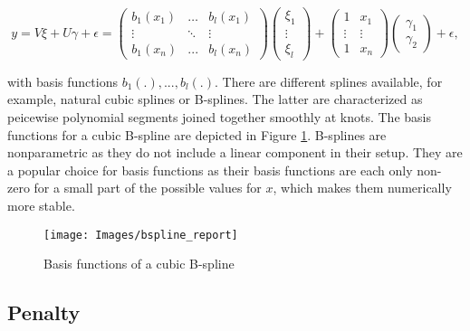 \documentclass[12pt]{article}
\begin{document}
$$y = V\xi + U\gamma +\epsilon
= \begin{pmatrix}
b_1(x_1) & \dots & b_l(x_1) \\
 \vdots  & \ddots & \vdots \\
b_1(x_n) & ... & b_l(x_n)
\end{pmatrix} 
\begin{pmatrix}
\xi_1 \\
 \vdots   \\
\xi_l 
\end{pmatrix} 
+ 
\begin{pmatrix}
1 &  x_1 \\
 \vdots & \vdots \\
1 & x_n
\end{pmatrix} 
\begin{pmatrix}
\gamma_1 \\
\gamma_2 
\end{pmatrix} +\epsilon,
$$



with basis functions $b_1(.), ..., b_l(.)$. There are different splines available, for example, natural cubic splines or B-splines. The latter are characterized as peicewise polynomial segments joined together smoothly at knots. The basis functions for a cubic B-spline are depicted in Figure \ref{bsplines}. B-splines are nonparametric as they do not include a linear component in their setup. They are a popular choice for basis functions as their basis functions are each only non-zero for a small part of the possible values for $x$, which makes them numerically more stable.

\begin{figure}[t]
\begin{center}
\vspace{2em}
\texttt{[image: Images/bspline\_report]}
\end{center}
\vspace{-2em}
\caption[caption]{Basis functions of a cubic B-spline}\label{bsplines}
\end{figure}


\subsection{Penalty}\label{prs}
\end{document}
